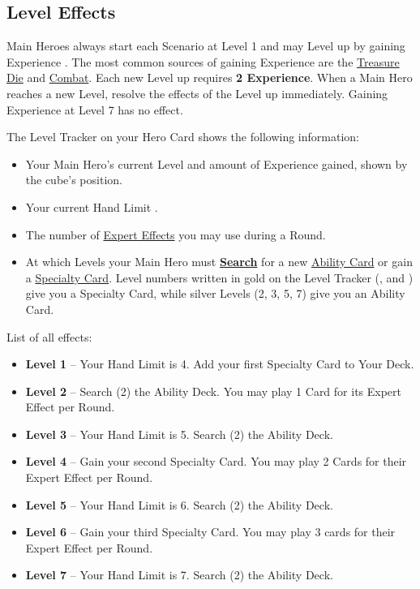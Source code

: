 
\clearpage

\begin{multicols}{2}

\subsection*{\hypertarget{Level}{Level Effects}}
Main Heroes always start each Scenario at Level 1 and may Level up by gaining Experience .
The most common sources of gaining Experience are the \hyperlink{Resources}{Treasure Die} and \hyperlink{Combatexperience}{Combat}.
Each new Level up requires \textbf{2 Experience}.
When a Main Hero reaches a new Level, resolve the effects of the Level up immediately.
Gaining Experience at Level 7 has no effect.\par
The Level Tracker on your Hero Card shows the following information:
\begin{itemize}
\item Your Main Hero's current Level and amount of Experience gained, shown by the cube's position.
\item Your current Hand Limit .
\item The number of \hyperlink{Ability}{Expert Effects}  you may use during a Round.
\item At which Levels your Main Hero must \hyperlink{Playerdecks}{\textbf{Search}} for a new \hyperlink{Ability}{Ability Card} or gain a \hyperlink{Specialty}{Specialty Card}.
Level numbers written in gold on the Level Tracker (,  and ) give you a Specialty Card, while silver Levels (2, 3, 5, 7) give you an Ability Card.
\end{itemize}
\vfill\null
\columnbreak
List of all effects:
\begin{itemize}
\item \textbf{Level 1} – Your Hand Limit is 4.
Add your first Specialty Card to Your Deck.
\item \textbf{Level 2} – Search (2) the Ability Deck.
You may play 1 Card for its Expert Effect per Round.
\item \textbf{Level 3} – Your Hand Limit is 5.
Search (2) the Ability Deck.
\item \textbf{Level 4} – Gain your second Specialty Card.
You may play 2 Cards for their Expert Effect per Round.
\item \textbf{Level 5} – Your Hand Limit is 6.
Search (2) the Ability Deck.
\item \textbf{Level 6} – Gain your third Specialty Card.
You may play 3 cards for their Expert Effect per Round.
\item \textbf{Level 7} – Your Hand Limit is 7.
Search (2) the Ability Deck.
\end{itemize}


\end{multicols}
